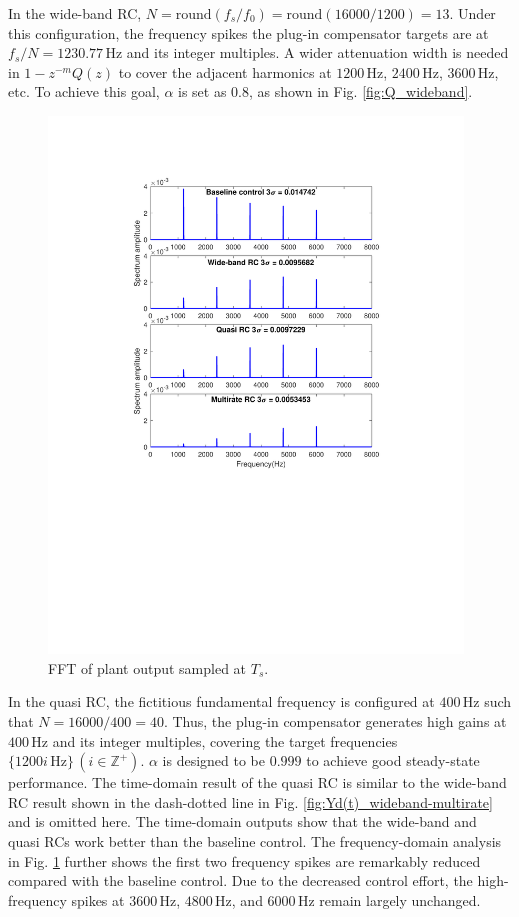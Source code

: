 \documentclass [11pt, proquest] {uwthesis}[2020/02/24]
\begin{document}
In the wide-band RC, $N=\text{round}(f_{s}/f_{0})=\text{round}(16000/1200)=13$.
Under this configuration, the frequency spikes the plug-in compensator
targets are at $f_{s}/N=1230.77\,\text{Hz}$ and its integer multiples.
A wider attenuation width is needed in $1-z^{-m}Q(z)$ to cover the
adjacent harmonics at $1200\,\text{Hz}$, $2400\,\text{Hz}$, $3600\,\text{Hz}$,
etc. To achieve this goal, $\alpha$ is set as 0.8, as shown in Fig.
\ref{fig:Q_wideband}.
\begin{figure}[!ht]
\begin{centering}
\includegraphics[width=11cm]{Fractional-order-RC/Spectrum_all}
\par\end{centering}
\caption{\label{fig:FFT}FFT of plant output sampled at $T_{s}$.}
\end{figure}
In the quasi RC, the fictitious fundamental frequency is configured
at $400\,\text{Hz}$ such that $N=16000/400=40$. Thus, the plug-in
compensator generates high gains at $400\,\text{Hz}$ and its integer
multiples, covering the target frequencies $\{1200i\,\text{Hz}\}\,(i\in\mathbb{Z}^{+})$.
$\alpha$ is designed to be $0.999$ to achieve good steady-state
performance. The time-domain result of the quasi RC is similar to
the wide-band RC result shown in the dash-dotted line in Fig. \ref{fig:Yd(t)_wideband-multirate}
and is omitted here. The time-domain outputs show that the wide-band
and quasi RCs work better than the baseline control. The frequency-domain
analysis in Fig. \ref{fig:FFT} further shows the first two frequency
spikes are remarkably reduced compared with the baseline control.
Due to the decreased control effort, the high-frequency spikes at
$3600\,\text{Hz}$, $4800\,\text{Hz}$, and $6000\,\text{Hz}$ remain
largely unchanged. 
\end{document}
